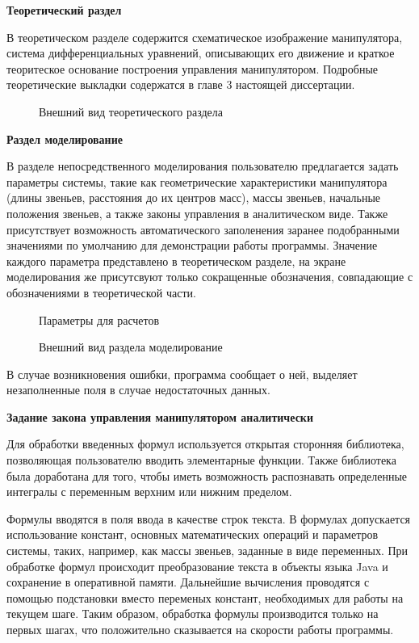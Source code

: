\par
\textbf{Теоретический раздел}

В теоретическом разделе содержится схематическое изображение манипулятора, система дифференциальных уравнений, описывающих его движение и краткое теоритеское основание построения управления манипулятором. Подробные теоретические выкладки содержатся в главе 3 настоящей  диссертации.
\nopagebreak[4]
\begin{figure}[h]
\caption{Внешний вид теоретического раздела}
\label{ris:theory}
\end{figure} 

\par
\textbf{Раздел моделирование}

В разделе непосредственного моделирования пользователю предлагается задать параметры системы, такие как геометрические характеристики манипулятора (длины звеньев, расстояния до их центров масс), массы звеньев, начальные положения звеньев, а также законы управления в аналитическом виде. Также присутствует возможность автоматического заполенения заранее подобранными значениями по умолчанию для демонстрации работы программы. Значение каждого параметра представлено в теоретическом разделе, на экране моделирования же присутсвуют только сокращенные обозначения, совпадающие с обозначениями в теоретической части.

\begin{figure}[h]
\caption{Параметры для расчетов}
\label{ris:params}
\end{figure} 

\begin{figure}[h]
\caption{Внешний вид раздела моделирование}
\label{ris:modeling}
\end{figure}

В случае возникновения ошибки, программа сообщает о ней, выделяет незаполненные поля в случае недостаточных данных.
\par
\textbf{Задание закона управления манипулятором аналитически}

Для обработки введенных формул используется открытая сторонняя библиотека, позволяющая пользователю вводить элементарные функции. Также библиотека была доработана для того, чтобы иметь возможность распознавать определенные интегралы с переменным верхним или нижним пределом.

Формулы вводятся в поля ввода в качестве строк текста. В формулах допускается использование констант, основных математических операций и параметров системы, таких, например, как массы звеньев, заданные в виде переменных. При обработке формул происходит преобразование текста в объекты языка Java и сохранение в оперативной памяти. Дальнейшие вычисления проводятся с помощью подстановки вместо переменых констант, необходимых для работы на текущем шаге. Таким образом, обработка формулы производится только на первых шагах, что положительно сказывается на скорости работы программы.

